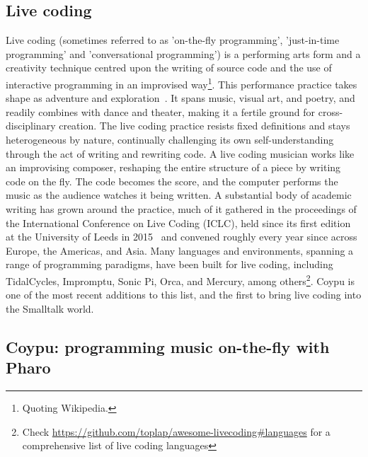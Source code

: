 \documentclass[
]{ceurart}
\begin{document}
\subsection{Live coding}
Live coding (sometimes referred to as 'on-the-fly programming', 'just-in-time programming' and 'conversational programming') is a performing arts form and a creativity technique centred upon the writing of source code and the use of interactive programming in an improvised way\footnote{Quoting Wikipedia.}. This performance practice takes shape as adventure and exploration~\cite{Blac22a}. It spans music, visual art, and poetry, and readily combines with dance and theater, making it a fertile ground for cross-disciplinary creation. The live coding practice resists fixed definitions and stays heterogeneous by nature, continually challenging its own self-understanding through the act of writing and rewriting code.
A live coding musician works like an improvising composer, reshaping the entire structure of a piece by writing code on the fly. The code becomes the score, and the computer performs the music as the audience watches it being written.
A substantial body of academic writing has grown around the practice, much of it gathered in the proceedings of the International Conference on Live Coding (ICLC), held since its first edition at the University of Leeds in 2015~\cite{McLe15a} and convened roughly every year since across Europe, the Americas, and Asia.
Many languages and environments, spanning a range of programming paradigms, have been built for live coding, including TidalCycles, Impromptu, Sonic Pi, Orca, and Mercury, among others\footnote{Check \url{https://github.com/toplap/awesome-livecoding\#languages} for a comprehensive list of live coding languages}. Coypu is one of the most recent additions to this list, and the first to bring live coding into the Smalltalk world.

\subsection{Coypu: programming music on-the-fly with Pharo}
\end{document}
